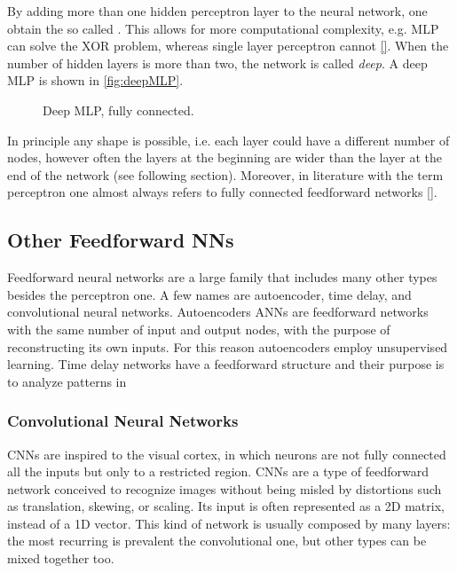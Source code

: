 By adding more than one hidden perceptron layer to the neural network, one obtain the so called .
This allows for more computational complexity, e.g. \acs{MLP} can solve the \acs{XOR} problem, whereas single layer perceptron cannot \ref{}.
When the number of hidden layers is more than two, the network is called \textit{deep}.
A deep \acs{MLP} is shown in \autoref{fig:deepMLP}.

\begin{figure}[ht]
	\centering
	
	\caption{	Deep \acf{MLP}, fully connected.}
	\label{fig:deepMLP}
\end{figure}

In principle any shape is possible, i.e. each layer could have a different number of nodes, however often the layers at the beginning are wider than the layer at the end of the network (see following section).
Moreover, in literature with the term perceptron one almost always refers to fully connected feedforward networks \ref{}.

\subsection{Other Feedforward NNs}
\label{ssec:Other_Feedforward_NNs}

Feedforward neural networks are a large family that includes many other types besides the perceptron one.
A few names are autoencoder, time delay, and convolutional neural networks.
Autoencoders \acsp{ANN} are feedforward networks with the same number of input and output nodes, with the purpose of reconstructing its own inputs.
For this reason autoencoders employ unsupervised learning.
Time delay networks have a feedforward structure and their purpose is to analyze patterns in

\subsubsection{Convolutional Neural Networks}
\label{par:Convolutional}
\acp{CNN} are inspired to the visual cortex, in which neurons are not fully connected all the inputs but only to a restricted region.
\aclp{CNN} are a type of feedforward network conceived to recognize images without being misled by distortions such as translation, skewing, or scaling.
Its input is often represented as a 2D matrix, instead of a 1D vector.
This kind of network is usually composed by many layers: the most recurring is prevalent the convolutional one, but other types can be mixed together too.

